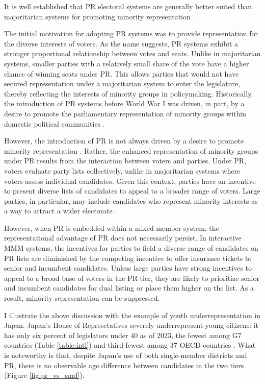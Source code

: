 \documentclass[a4paper, 11pt]{article}
\begin{document}
It is well established that PR electoral systems are generally better suited than majoritarian systems for promoting minority representation \citep{matlandContagionWomenCandidates1996, matlandWomensRepresentationNational1998, meserveGenderIncumbencyParty2020}. 

The initial motivation for adopting PR systems was to provide representation for the diverse interests of voters. As the name suggests, PR systems exhibit a stronger proportional relationship between votes and seats. Unlike in majoritarian systems, smaller parties with a relatively small share of the vote have a higher chance of winning seats under PR. This allows parties that would not have secured representation under a majoritarian system to enter the legislature, thereby reflecting the interests of minority groups in policymaking. Historically, the introduction of PR systems before World War I was driven, in part, by a desire to promote the parliamentary representation of minority groups within domestic political communities \citep{rokkanCitizensElectionsParties1970}.

However, the introduction of PR is not always driven by a desire to promote minority representation \citep{ahmedReadingHistoryForward2010, boixSettingRulesGame1999, cusackEconomicInterestsOrigins2007}. Rather, the enhanced representation of minority groups under PR results from the interaction between voters and parties. Under PR, voters evaluate party lists collectively, unlike in majoritarian systems where voters assess individual candidates. Given this context, parties have an incentive to present diverse lists of candidates to appeal to a broader range of voters. Large parties, in particular, may include candidates who represent minority interests as a way to attract a wider electorate \citep[p.188]{norrisElectoralEngineeringVoting2004}.

However, when PR is embedded within a mixed-member system, the representational advantage of PR does not necessarily persist. In interactive MMM systems, the incentives for parties to field a diverse range of candidates on PR lists are diminished by the competing incentive to offer insurance tickets to senior and incumbent candidates. Unless large parties have strong incentives to appeal to a broad base of voters in the PR tier, they are likely to prioritize senior and incumbent candidates for dual listing or place them higher on the list. As a result, minority representation can be suppressed.

I illustrate the above discussion with the example of youth underrepresentation in Japan. Japan's House of Represetatives severely underrepresent young citizens: it has only six percent of legislators under 40 as of 2023, the fewest among G7 countries (Table \ref{table:intl}) and third-fewest among 37 OECD countries \citep{mccleanSilverDemocracyYouth2020}. What is noteworthy is that, despite Japan’s use of both single-member districts and PR, there is no observable age difference between candidates in the two tiers (Figure \ref{fig:pr_vs_smd}).
\end{document}
